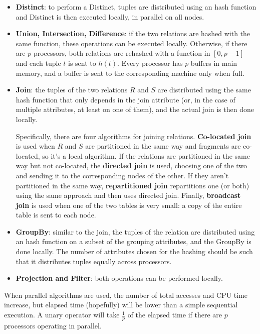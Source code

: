 \begin{itemize}
    \item \textbf{Distinct}: to perform a Distinct, tuples are distributed using an hash function and Distinct is then executed locally, in parallel on all nodes.

    \item \textbf{Union, Intersection, Difference}: if the two relations are hashed with the same function, these operations can be executed locally. Otherwise, if there are $p$ processors, both relations are rehashed with a function in $[0,p-1]$ and each tuple $t$ is sent to $h(t)$. Every processor has $p$ buffers in main memory, and a buffer is sent to the corresponding machine only when full.

    \item \textbf{Join}: the tuples of the two relations $R$ and $S$ are distributed using the same hash function that only depends in the join attribute (or, in the case of multiple attributes, at least on one of them), and the actual join is then done locally.

    Specifically, there are four algorithms for joining relations. \textbf{Co-located join} is used when $R$ and $S$ are partitioned in the same way and fragments are co-located, so it's a local algorithm. If the relations are partitioned in the same way but not co-located, the \textbf{directed join} is used, choosing one of the two and sending it to the corresponding nodes of the other. If they aren't partitioned in the same way, \textbf{repartitioned join} repartitions one (or both) using the same approach and then uses directed join. Finally, \textbf{broadcast join} is used when one of the two tables is very small: a copy of the entire table is sent to each node.

    \item \textbf{GroupBy}: similar to the join, the tuples of the relation are distributed using an hash function on a subset of the grouping attributes, and the GroupBy is done locally. The number of attributes chosen for the hashing should be such that it distributes tuples equally across processors.

    \item \textbf{Projection and Filter}: both operations can be performed locally.
\end{itemize}
When parallel algorithms are used, the number of total accesses and CPU time increase, but elapsed time (hopefully) will be lower than a simple sequential execution. A unary operator will take $\frac{1}{p}$ of the elapsed time if there are $p$ processors operating in parallel.

